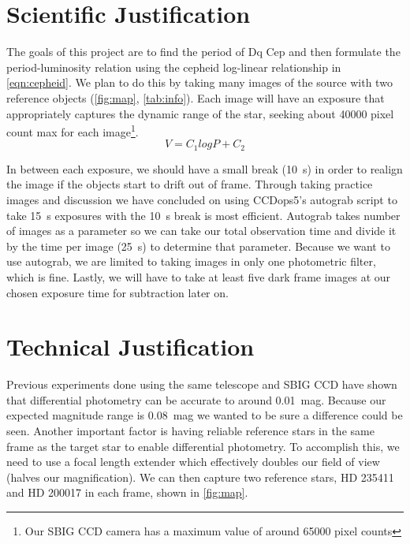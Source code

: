\documentclass[]{article}
\begin{document}
\section{Scientific Justification}
	The goals of this project are to find the period of Dq Cep and then formulate the period-luminosity relation using the cepheid log-linear relationship in \autoref{eqn:cepheid}.
	We plan to do this by taking many images of the source with two reference objects (\autoref{fig:map}, \autoref{tab:info}). Each image will have an exposure that appropriately captures the dynamic range of the star, seeking about \num{40000} pixel count max for each image\footnote{Our SBIG CCD camera has a maximum value of around \num{65000} pixel counts}.
	\begin{equation}
	V = C_1 log{P} + C_2
	\label{eqn:cepheid}
	\end{equation}

	In between each exposure, we should have a small break (\SI{10}{\second}) in order to realign the image if the objects start to drift out of frame. Through taking practice images and discussion we have concluded on using CCDops5's autograb script to take \SI{15}{\second} exposures with the \SI{10}{\second} break is most efficient. Autograb takes number of images as a parameter so we can take our total observation time and divide it by the time per image (\SI{25}{\second}) to determine that parameter. Because we want to use autograb, we are limited to taking images in only one photometric filter, which is fine. Lastly, we will have to take at least five dark frame images at our chosen exposure time for subtraction later on.


\section{Technical Justification}

	Previous experiments done using the same telescope and SBIG CCD have shown that differential photometry can be accurate to around \SI{0.01}{mag}. Because our expected magnitude range is \SI{0.08}{mag} we wanted to be sure a difference could be seen. Another important factor is having reliable reference stars in the same frame as the target star to enable differential photometry. To accomplish this, we need to use a focal length extender which effectively doubles our field of view (halves our magnification). We can then capture two reference stars, HD 235411 and HD 200017 in each frame, shown in \autoref{fig:map}.
	
\end{document}
